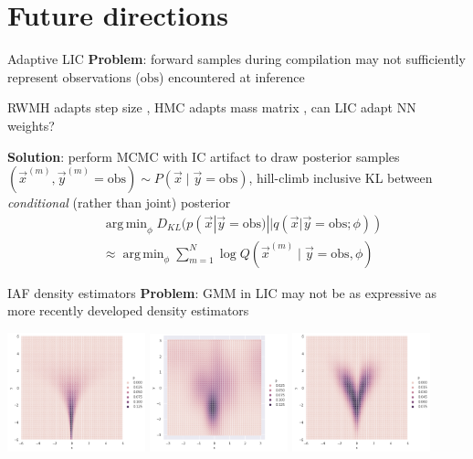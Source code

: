 \documentclass[12pt]{beamer}
\DeclareMathOperator*{\argmin}{arg\,min}
\begin{document}
\section{Future directions}

\begin{frame}{Adaptive LIC}
    \textbf{Problem}: forward samples during compilation may not sufficiently represent observations ($\text{obs}$) encountered at inference

    RWMH adapts step size \cite{garthwaite2016adaptive}, HMC adapts
    mass matrix \cite{hoffman2014no}, can LIC adapt NN weights?

    \textbf{Solution}: perform MCMC with IC artifact to draw posterior samples $(\vec{x}^{(m)}, \vec{y}^{(m)}=\text{obs}) \sim P(\vec{x} \mid \vec{y}=\text{obs})$,
    hill-climb inclusive KL between \emph{conditional} (rather than joint) posterior
    \begin{align*}
        &\argmin_{\phi} D_{KL}(p(\vec{x} | \vec{y}=\text{obs}) || q(\vec{x} | \vec{y}=\text{obs}; \phi)) \\
        &\approx 
        \argmin_{\phi} \sum_{m=1}^N \log Q(\vec{x}^{(m)} \mid \vec{y} = \text{obs}, \phi)
    \end{align*}
\end{frame}

\begin{frame}{IAF density estimators}
    \textbf{Problem}: GMM in LIC may not be as expressive
    as more recently developed density estimators \cite{kingma2016improved}

    \includegraphics[width=0.3\textwidth]{figures/neal_funnel.png}
    \includegraphics[width=0.3\textwidth]{figures/neal_funnel_gmm.png}
    \includegraphics[width=0.3\textwidth]{figures/neal_funnel_iaf.png}
\end{frame}
\end{document}
